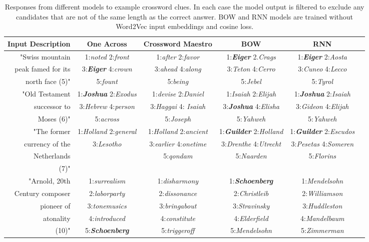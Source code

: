 \documentclass[11pt,letterpaper]{article}
\begin{document}
\begin{table*}[ht]
{\small
\emph
\hfill{}
\begin{tabular}{r|ccccc|}
\bf Input Description & \bf One Across& \bf Crossword Maestro & \bf BOW &  \bf RNN  \\
\hline

\rule{0pt}{3ex} 

  "Swiss mountain & 1:\emph{noted} 2:\emph{front} & 1:\emph{after} 2:\emph{favor} & 1:\emph{\bf Eiger} 2.\emph{Crags}   &  1:\emph{\bf Eiger} 2:\emph{Aosta}  \\
peak famed for its & 3:\emph{\bf Eiger} 4:\emph{crown} & 3:\emph{ahead} 4:\emph{along} &   3:\emph{Teton} 4:\emph{Cerro}  & 3:\emph{Cuneo} 4:\emph{Lecco}\\
 north face (5)" & 5:\emph{fount} &  5:\emph{being} &  5:\emph{Jebel} &  5:\emph{Tyrol} \\
\rule{0pt}{3ex} 
  "Old Testament & 1:\emph{\bf Joshua} 2:\emph{Exodus} &  1:\emph{devise} 2:\emph{Daniel}& 1:\emph{Isaiah} 2:\emph{Elijah}   &  1:\emph{\bf Joshua} 2:\emph{Isaiah}  \\
successor to & 3:\emph{Hebrew} 4:\emph{person} &   3:\emph{Haggai} 4:\emph{ Isaiah}  &3:\emph{\bf Joshua} 4:\emph{Elisha}  & 3:\emph{Gideon} 4:\emph{Elijah}\\
 Moses (6)" & 5:\emph{across} & 5:\emph{Joseph}&  5:\emph{Yahweh} &  5:\emph{Yahweh} \\	
\rule{0pt}{3ex} 
  "The former & 1:\emph{Holland} 2:\emph{general} &  1:\emph{Holland} 2:\emph{ancient} & 1:\emph{\bf Guilder} 2:\emph{Holland}   &  1:\emph{\bf 	Guilder} 2:\emph{Escudos}  \\
currency of the  & 3:\emph{Lesotho} &   3:\emph{earlier} 4:\emph{onetime}&   3:\emph{Drenthe} 4:\emph{Utrecht}  & 3:\emph{Pesetas} 4:\emph{Someren}\\
 Netherlands&  &5:\emph{qondam}&  5:\emph{Naarden} &  5:\emph{Florins} \\
 (7)"&  \\
\rule{0pt}{3ex} 
  "Arnold, 20th & 1:\emph{surrealism} &  1:\emph{disharmony}  & 1:\emph{\bf Schoenberg}   &  1:\emph{Mendelsohn} \\
Century composer &  2:\emph{laborparty}  &   2:\emph{dissonance} &  2:\emph{Christleib}  &  2:\emph{Williamson}  \\
pioneer of &  3:\emph{tonemusics}  &  3:\emph{bringabout} &  3:\emph{Stravinsky}  &  3:\emph{Huddleston}   \\
 atonality &4:\emph{introduced}  & 4:\emph{constitute} &4:\emph{Elderfield} & 4:\emph{Mandelbaum} \\
(10)"& 5:\emph{\bf Schoenberg} & 5:\emph{triggeroff} & 5:\emph{Mendelsohn} &  5:\emph{Zimmerman}\\

\end{tabular}}
\hfill{}
\caption{Responses from different models to example crossword clues. In each case the model output is filtered to exclude any candidates that are not of the same length as the correct answer. BOW and RNN models are trained without Word2Vec input embeddings and cosine loss.}
\label{egs}
\end{table*}
\end{document}
